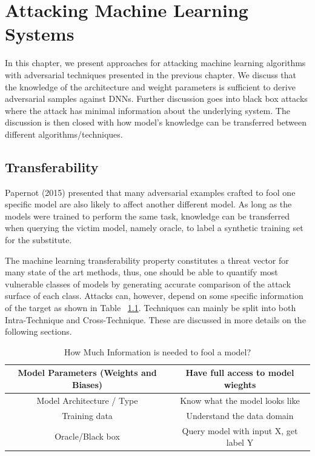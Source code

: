 \chapter{Attacking Machine Learning Systems}

In this chapter, we present approaches for attacking machine learning algorithms with adversarial techniques presented in the previous chapter. We discuss that the knowledge of the architecture and weight parameters is sufficient to derive adversarial samples against DNNs. Further discussion goes into black box attacks where the attack has minimal information about the underlying system. The discussion is then closed with how model's knowledge can be transferred between different algorithms/techniques.


\section{Transferability}

Papernot (2015) presented that many adversarial examples crafted to fool one specific model are also likely to affect another different model. As long as the models were trained to perform the same task, knowledge can be transferred when querying the victim model, namely oracle, to label a synthetic training set for the substitute.

The machine learning transferability property constitutes a threat vector for many state of the art methods, thus, one should be able to quantify most vulnerable classes of models by generating accurate comparison of the attack surface of each class. Attacks can, however, depend on some specific information of the target as shown in Table ~\ref{tbl:attack_info}. Techniques can mainly be split into both Intra-Technique and Cross-Technique. These are discussed in more details on the following sections.

\vskip 1cm

\begin {table}
\begin{tabular}{|c|c|}
	\hline 
	Model Parameters (Weights and Biases) & Have full access to model wieghts \\ 
	\hline 
	Model Architecture / Type & Know what the model looks like \\ 
	\hline 
	Training data & Understand the data domain \\ 
	\hline 
	Oracle/Black box & Query model with input X, get label Y \\ 
	\hline 
	
\end{tabular} 
\caption {How Much Information is needed to fool a model?}
\label{tbl:attack_info}
\end {table}

